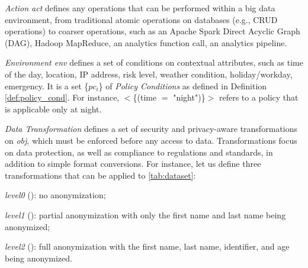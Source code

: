       \textit{Action act} defines any operations that can be performed within a big data environment, from traditional atomic operations on databases (e.g., CRUD operations) to coarser operations, such as an Apache Spark Direct Acyclic Graph (DAG), Hadoop MapReduce, an analytics function call, an analytics pipeline.

      \textit{Environment env} defines a set of conditions on contextual attributes, such as time of the day, location, IP address, risk level, weather condition, holiday/workday, emergency. It is a set \{$pc_i$\} of \emph{Policy Conditions} as defined in Definition \ref{def:policy_cond}. For instance, $<$\{(time $=$ "night")\}$>$ refers to a policy that is applicable only at night.

      \textit{Data Transformation \TP} defines a set of security and privacy-aware transformations on \textit{obj}, which must be enforced before any access to data. Transformations focus on data protection, as well as compliance to regulations and standards, in addition to simple format conversions. For instance, let us define three transformations that can be applied to \cref{tab:dataset}:
                \begin{enumerate*}[label=\roman*)]
                  \item \emph{level0} (): no anonymization;
                  \item \emph{level1} (): partial anonymization with only the first name and last name being anonymized;
                  \item \emph{level2} (): full anonymization with the first name, last name, identifier, and age being anonymized.
                \end{enumerate*}


